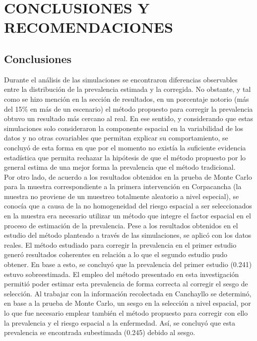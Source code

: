 \chapter{CONCLUSIONES Y RECOMENDACIONES}

\section{Conclusiones}


Durante el análisis de las simulaciones se encontraron diferencias observables entre la distribución de la prevalencia estimada y la corregida. No obstante, y tal como se hizo mención en la sección de resultados, en un porcentaje notorio (más del 15\% en más de un escenario) el método propuesto para corregir la prevalencia obtuvo un resultado más cercano al real. En ese sentido, y considerando que estas simulaciones solo consideraron la componente espacial en la variabilidad de los datos y no otras covariables que permitan explicar su comportamiento, se concluyó de esta forma en que por el momento no existía la suficiente evidencia estadística que permita rechazar la hipótesis de que el método propuesto por lo general estima de una mejor forma la prevalencia que el método tradicional. \\
Por otro lado, de acuerdo a los resultados obtenidos en la prueba de Monte Carlo para la muestra correspondiente a la primera intervención en Corpacancha (la muestra no proviene de un muestreo totalmente aleatorio a nivel especial), se conocía que a causa de la no homogeneidad del riesgo espacial a ser seleccionados en la muestra era necesario utilizar un método que integre el factor espacial en el proceso de estimación de la prevalencia. Pese a los resultados obtenidos en el estudio del método planteado a través de las simulaciones, se aplicó con los datos reales. El método estudiado para corregir la prevalencia en el primer estudio generó resultados coherentes en relación a lo que el segundo estudio pudo obtener. En base a esto, se concluyó que la prevalencia del primer estudio (0.241) estuvo sobreestimada. El empleo del método presentado en esta investigación permitió poder estimar esta prevalencia de forma correcta al corregir el sesgo de selección. Al trabajar con la información recolectada en Canchayllo se determinó, en base a la prueba de Monte Carlo, un sesgo en la selección a nivel espacial, por lo que fue necesario emplear también el método propuesto para corregir con ello la prevalencia y el riesgo espacial a la enfermedad. Así, se concluyó que esta prevalencia se encontrada subestimada (0.245) debido al sesgo.\\
